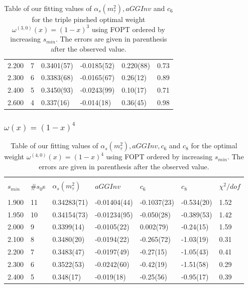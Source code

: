\documentclass[../../index.tex]{subfiles}
\begin{document}
\begin{table}[H]
\begin{tabular}{llllll}
    2.200 & 7  & 0.3401(57) & -0.0185(52) & 0.220(88) & 0.73 \\
    2.300 & 6  & 0.3383(68) & -0.0165(67) & 0.26(12) & 0.89 \\
    2.400 & 5  & 0.3450(93) & -0.0243(99) & 0.10(17) & 0.71 \\
    2.600 & 4  & 0.337(16) & -0.014(18) & 0.36(45) & 0.98 \\
    \bottomrule
  \end{tabular}
  \caption{Table of our fitting values of $\alpha_s(m_\tau^2), aGGInv$ and $c_{6}$
    for the triple pinched optimal weight $\omega^{(3,0)}(x)=(1-x)^3$ using FOPT ordered
    by increasing $s_{min}$. The errors are given in parenthesis after the observed value.}
  \label{table:fitOpt30AlD4D6}
\end{table}

\subsubsection{$\omega(x) = (1-x)^4$}
\begin{table}[H]
  \centering
  \begin{tabular}{lllllll}
    \toprule \\
    $s_{min}$ & \#$s_0$s & $\alpha_s(m_\tau^2)$ & $aGGInv$ & $c_{6}$ & $c_{8}$ & $\chi^2/dof$  \\
    \hline \\
    1.900 & 11 & 0.34283(71) & -0.01404(44) & -0.1037(23) & -0.534(20) & 1.52 \\
    1.950 & 10 & 0.34154(73) & -0.01234(95) & -0.050(28) & -0.389(53) & 1.42 \\
    2.000 & 9  & 0.3399(14) & -0.0105(22) & 0.002(79) & -0.24(15) & 1.59 \\
    2.100 & 8  & 0.3480(20) & -0.0194(22) & -0.265(72) & -1.03(19) & 0.31 \\
    2.200 & 7  & 0.3483(47) & -0.0197(49) & -0.27(15) & -1.05(43) & 0.41 \\
    2.300 & 6  & 0.3522(53) & -0.0242(60) & -0.42(19) & -1.51(58) & 0.29 \\
    2.400 & 5  & 0.348(17) & -0.019(18) & -0.25(56) & -0.95(17) & 0.39 \\
    \bottomrule
  \end{tabular}
  \caption{Table of our fitting values of $\alpha_s(m_\tau^2), aGGInv, c_6$ and $c_{8}$
    for the optimal weight $\omega^{(4,0)}(x)=(1-x)^4$ using FOPT ordered
    by increasing $s_{min}$. The errors are given in parenthesis after the observed value.}
  \label{table:fitOpt30AlD4D6D8}
\end{table}
\end{document}
